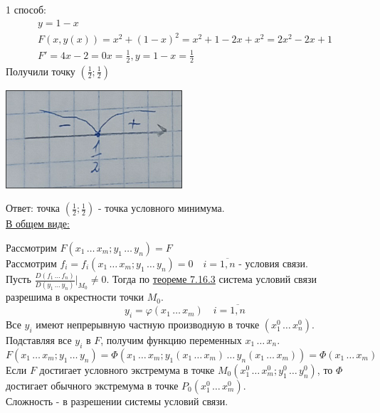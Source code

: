 \documentclass[12pt]{article}
\let\ORIincludegraphics\includegraphics
\renewcommand{\includegraphics}[2][]{\ORIincludegraphics[scale=0.65,#1]{#2}}
\begin{document}
    1 способ:
    \begin{gather*}
        y = 1 - x\\
        F(x, y(x)) = x^2 + (1 - x)^2 = x^2 + 1 - 2x + x^2 = 2x^2 - 2x + 1\\
        F' = 4x - 2 = 0
        x = \frac{1}{2}, y = 1 - x = \frac{1}{2}
    \end{gather*}
    Получили точку $\left( \frac{1}{2}; \frac{1}{2} \right)$
    \begin{center}
        \includegraphics{7.17.2.png}
    \end{center}
    Ответ: точка $\left( \frac{1}{2}; \frac{1}{2} \right)$ - точка условного минимума.\\
    \underline{В общем виде:}
    \begin{adjustwidth}{1.5em}{1.5em}
        Рассмотрим $F(x_1\, \dots\, x_m; y_1\, \dots\, y_n) = F$\\
        Рассмотрим $f_i = f_i(x_1\, \dots\, x_m; y_1\, \dots\, y_n) = 0 \quad i = \overline{1, n}$ - условия связи.\\
        Пусть $\frac{D(f_1\, \dots\, f_n)}{D(y_1\, \dots\, y_n)} \Big|_{M_0} \ne 0$. Тогда по \hyperref[th:7.16.3]{теореме 7.16.3} система условий связи разрешима в окрестности точки $M_0$.
        \[ y_i = \varphi (x_1\, \dots\, x_m) \quad i = \overline{1, n} \]
        Все $y_i$ имеют непрерывную частную производную в точке $(x^0_1\, \dots\, x^0_n)$.\\
        Подставляя все $y_i$ в $F$, получим функцию переменных $x_1\, \dots\, x_n$.
        \[ F(x_1\, \dots\, x_m; y_1\, \dots\, y_n) = \Phi (x_1\, \dots\, x_m; y_1(x_1\, \dots\, x_m)\, \dots\, y_n(x_1\, \dots\, x_m)) = \Phi (x_1\, \dots\, x_m) \]
        Если $F$ достигает условного экстремума в точке $M_0 (x^0_1\, \dots\, x^0_m; y^0_1\, \dots\, y^0_n)$, то $\Phi$ достигает обычного экстремума в точке $P_0(x^0_1\, \dots\, x^0_m)$.\\
        Сложность - в разрешении системы условий связи.
    \end{adjustwidth}
\end{document}
